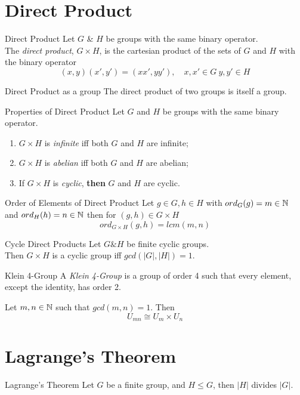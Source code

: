 \documentclass[11pt,a4paper]{article}
\begin{document}
\section{Direct Product}

\subtitle{Definition 10.1 - }{Direct Product}
Let $G$ \& $H$ be groups with the same binary operator.\\
The \textit{direct product}, $G \times H$, is the cartesian product of the sets of $G$ and $H$ with the binary operator
$$(x, y)(x', y') = (xx', yy'),\quad x, x' \in G\ y, y' \in H$$

\subtitle{Proposition 10.2 - }{Direct Product as a group}
The direct product of two groups is itself a group.\\

\subtitle{Proposition 10.3 - }{Properties of Direct Product}
Let $G$ and $H$ be groups with the same binary operator.
\begin{enumerate}[label=\roman*)]
  \item $G \times H$ is \textit{infinite} iff both $G$ and $H$ are infinite;
  \item $G \times H$ is \textit{abelian} iff both $G$ and $H$ are abelian;
  \item If $G \times H$ is \textit{cyclic}, \textbf{then} $G$ and $H$ are cyclic.
\end{enumerate}

\subtitle{Proposition 10.4 - }{Order of Elements of Direct Product}
Let $g \in G, h \in H$ with $ord_G(g) = m \in \mathbb{N}$ and $ord_H(h) = n \in \mathbb{N}$ then for $(g, h) \in G \times H$
$$ord_{G \times H}(g, h) = lcm(m, n)$$

\subtitle{Theorem 10.5 - }{Cycle Direct Products}
Let $G \& H$ be finite cyclic groups.\\
Then $G \times H$ is a cyclic group iff $gcd(|G|, |H|) = 1$.\\

\subtitle{Definition 10.6 - }{Klein 4-Group}
A \textit{Klein 4-Group} is a group of order 4 such that every element, except the identity, has order 2.\\

\subtitle{Proposition 10.7 - }{}
Let $m, n \in \mathbb{N}$ such that $gcd(m,n) = 1$. Then
$$U_{mn} \cong U_m \times U_n$$

\section{Lagrange's Theorem}

\subtitle{Theorem 11.1 - }{Lagrange's Theorem}
Let $G$ be a finite group, and $H \leq G$, then $|H|$ divides $|G|$.\\
\end{document}
